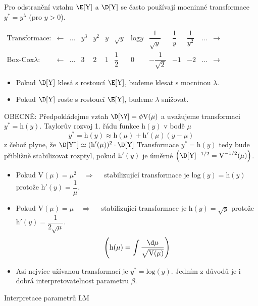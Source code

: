 Pro odstranění vztahu $ \E [\text{Y}] $ a $ \D[\text{Y}] $ se často používají mocninné transformace $ y^* = y^{\lambda} $ (pro $ y > 0 $).

\begin{table}[h]
\centering
$\begin{array}{ *{13}{c} }
\text{Transformace:} & \leftarrow & \dots &  y^3 &  y^2 &  y & \sqrt{y}  & \text{log}y & \dfrac{1}{\sqrt{y}}  & \dfrac{1}{y} & \dfrac{1}{y^2} & \dots  & \rightarrow \\
\text{Box-Cox} \lambda : &\leftarrow  & \dots & 3 & 2 & 1 & \dfrac{1}{2}  & 0 &  -\dfrac{1}{\sqrt{2}} & -1 & -2 & \dots & \rightarrow
\end{array}$
\end{table}

\begin{itemize}
\item Pokud $ \D[\text{Y}] $ klesá s rostoucí $ \E[\text{Y}] $, budeme klesat s mocninou $\lambda$.
\item Pokud $ \D[\text{Y}] $ roste s rostoucí $ \E[\text{Y}] $, budeme $\lambda$ snižovat.
\end{itemize}

OBECNĚ: Předpokládejme vztah $ \D[\Y] = \phi \text{V}(\mu) $ a uvažujeme transformaci $ y^* = \text{h}(y) $. Taylorův rozvoj 1. řádu funkce $ \text{h}(y) $ v bodě $ \mu $
$$  
 y^* = \text{h}(y) \approx \text{h}(\mu) + \text{h}'(\mu)(y-\mu)
$$
z čehož plyne, že $ \D[\text{Y}^*] \simeq ( \text{h}'(\mu) )^2 \cdot \D[\text{Y}] $
Transformace $  y^* = \text{h}(y) $ tedy bude přibližně stabilizovat rozptyl, pokud $ \text{h}'(y) $ je úměrné $ \left( \D[\text{Y}]^{-1/2} = \text{V}^{-1/2}(\mu) \right)$.

\begin{itemize}
\item Pokud $ \text{V}(\mu) = \mu^2 \quad \Rightarrow \quad $ stabilizující transformace je $ \text{log}(y) = \text{h}(y) $ protože $ \text{h}'(y) = \dfrac{1}{\mu} $.
\item Pokud $ \text{V}(\mu) = \mu \quad \Rightarrow \quad $ stabilizující transformace je $ \text{h}(y) = \sqrt{y} $ protože $ \text{h}'(y) = \dfrac{1}{2 \sqrt{\mu}} $.
$$  
 \left( \text{h}(\mu) =  \int \frac{\d \mu}{\sqrt{\text{V}(\mu)}} \right)
$$
\item Asi nejvíce užívanou transformací je $ y^* = \text{log}(y) $. Jedním z důvodů je i dobrá interpretovatelnost parametru $ \beta $.
\end{itemize}

Interpretace parametrů LM

